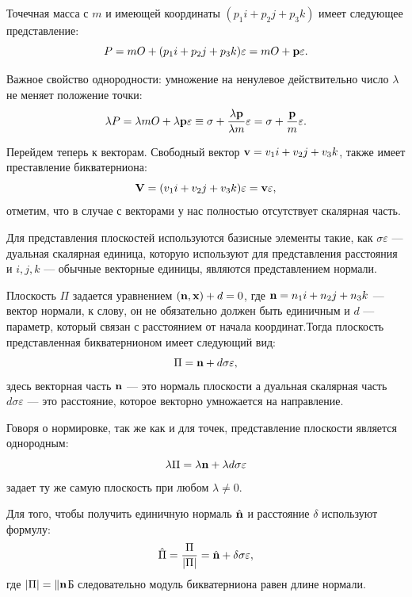 Точечная масса с $m$ и имеющей координаты $(p_1 i + p_2 j + p_3 k)$ имеет следующее представление:
\begin{equation*}
    P = mO + (p_1 i + p_2 j + p_3 k) \varepsilon = mO + \vb{p} \varepsilon.
\end{equation*}

Важное свойство однородности: умножение на ненулевое действительно число $\lambda$ не меняет положение точки:
\begin{equation*}
    \lambda P = \lambda mO + \lambda\vb{p}\varepsilon \equiv \sigma + \frac{\lambda\vb{p}}{\lambda m}\varepsilon = \sigma + \frac{\vb{p}}{m}\varepsilon.
\end{equation*}

Перейдем теперь к векторам. Свободный вектор $\vb{v} = v_1 i + v_2 j + v_3 k$, также имеет преставление бикватерниона:
\begin{equation*}
    \vb{V} = (v_1 i + v_2 j + v_3 k)\varepsilon = \vb{v}\varepsilon,
\end{equation*}
отметим, что в случае с векторами у нас полностью отсутствует скалярная часть.

Для представления плоскостей используются базисные элементы такие, как $\sigma \varepsilon$ --- дуальная скалярная единица, которую используют для представления расстояния и $i, j, k$ --- обычные векторные единицы, являются представлением нормали.

Плоскость $\Pi$ задается уравнением $(\vb{n}, \vb{x}) + d = 0$, где $\vb{n} = n_1 i + n_2 j + n_3 k$ --- вектор нормали, к слову, он не обязательно должен быть единичным и $d$ --- параметр, который связан с расстоянием от начала координат.Тогда плоскость представленная бикватернионом имеет следующий вид:
\begin{equation*}
    \Pi = \vb{n} + d \sigma \varepsilon,
\end{equation*}
здесь векторная часть $\vb{n}$ --- это нормаль плоскости а дуальная скалярная часть $d \sigma \varepsilon$ ---  это расстояние, которое векторно умножается на направление.

Говоря о нормировке, так же как и для точек, представление плоскости является однородным:
\begin{equation*}
    \lambda\Pi = \lambda \vb{n} + \lambda d \sigma \varepsilon
\end{equation*}
задает ту же самую плоскость при любом $\lambda \neq 0$.

Для того, чтобы получить единичную нормаль $\hat{\vb{n}}$ и расстояние $\delta$ используют формулу:
\begin{equation*}
    \hat{\Pi} = \frac{\Pi}{|\Pi|} = \hat{\vb{n}} + \delta \sigma \varepsilon,
\end{equation*}
где $|\Pi| = \|\vb{n}$Б следовательно модуль бикватерниона равен длине нормали.

